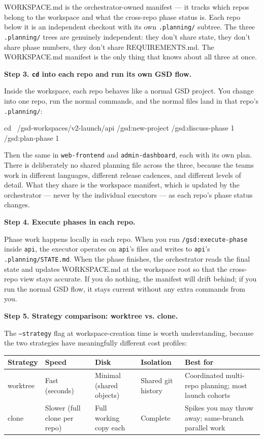 \documentclass[11pt,letterpaper,openany]{book}
\begin{document}
\begin{gsdscenario}
\noindent
WORKSPACE.md is the orchestrator-owned manifest --- it tracks which
repos belong to the workspace and what the cross-repo phase status
is. Each repo below it is an independent checkout with its own
\texttt{.planning/} subtree. The three \texttt{.planning/} trees
are genuinely independent: they don't share state, they don't share
phase numbers, they don't share REQUIREMENTS.md. The WORKSPACE.md
manifest is the only thing that knows about all three at once.

\textbf{Step 3. \texttt{cd} into each repo and run its own GSD flow.}

Inside the workspace, each repo behaves like a normal GSD project.
You change into one repo, run the normal commands, and the normal
files land in that repo's \texttt{.planning/}:

\begin{gsdbash}
cd ~/gsd-workspaces/v2-launch/api
/gsd:new-project
/gsd:discuss-phase 1
/gsd:plan-phase 1
\end{gsdbash}

\noindent
Then the same in \texttt{web-frontend} and \texttt{admin-dashboard},
each with its own plan. There is deliberately no shared planning
file across the three, because the teams work in different languages,
different release cadences, and different levels of detail. What
they share is the workspace manifest, which is updated by the
orchestrator --- never by the individual executors --- as each
repo's phase status changes.

\textbf{Step 4. Execute phases in each repo.}

Phase work happens locally in each repo. When you run
\texttt{/gsd:execute-phase} inside \texttt{api}, the executor operates
on \texttt{api}'s files and writes to \texttt{api}'s
\texttt{.planning/STATE.md}. When the phase finishes, the orchestrator
reads the final state and updates WORKSPACE.md at the workspace root
so that the cross-repo view stays accurate. If you do nothing, the
manifest will drift behind; if you run the normal GSD flow, it stays
current without any extra commands from you.

\textbf{Step 5. Strategy comparison: worktree vs. clone.}

The \texttt{--strategy} flag at workspace-creation time is worth
understanding, because the two strategies have meaningfully different
cost profiles:

\begin{center}
\small
\begin{tabularx}{\linewidth}{@{}lXXXX@{}}
\toprule
\textbf{Strategy} & \textbf{Speed} & \textbf{Disk} & \textbf{Isolation} & \textbf{Best for} \\
\midrule
worktree &
Fast (seconds) &
Minimal (shared objects) &
Shared git history &
Coordinated multi-repo planning; most launch cohorts \\
\addlinespace
clone &
Slower (full clone per repo) &
Full working copy each &
Complete &
Spikes you may throw away; same-branch parallel work \\
\bottomrule
\end{tabularx}
\end{center}


\end{gsdscenario}
\end{document}
